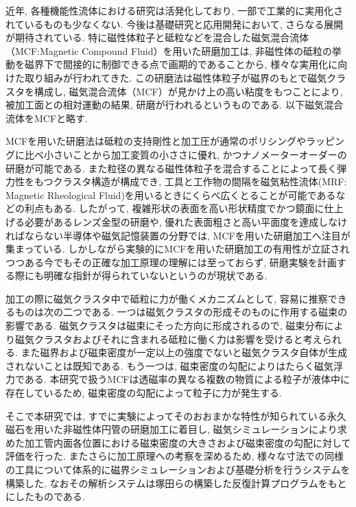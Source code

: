 \documentclass[11pt]{jarticle}
\begin{document}
近年, 各種機能性流体における研究は活発化しており, 一部で工業的に実用化されているものも少なくない\cite{磁性流体}. 今後は基礎研究と応用開発において, さらなる展開が期待されている. 特に磁性体粒子と砥粒などを混合した磁気混合流体（MCF:Magnetic Compound Fluid）を用いた研磨加工は, 非磁性体の砥粒の挙動を磁界下で間接的に制御できる点で画期的であることから, 様々な実用化に向けた取り組みが行われてきた. この研磨法は磁性体粒子が磁界のもとで磁気クラスタを構成し, 磁気混合流体（MCF）が見かけ上の高い粘度をもつことにより, 被加工面との相対運動の結果, 研磨が行われるというものである. 以下磁気混合流体をMCFと略す. \par
MCFを用いた研磨法は砥粒の支持剛性と加工圧が通常のポリシングやラッピングに比べ小さいことから加工変質の小ささに優れ\cite{精密機械加工の原理}, かつナノメーターオーダーの研磨が可能である. また粒径の異なる磁性体粒子を混合することによって長く弾力性をもつクラスタ構造が構成でき, 工具と工作物の間隔を磁気粘性流体(MRF: Magnetic Rheological Fluid)を用いるときにくらべ広くとることが可能であるなどの利点もある\cite{機能性流体}. したがって, 複雑形状の表面を高い形状精度でかつ鏡面に仕上げる必要があるレンズ金型の研磨や, 優れた表面粗さと高い平面度を達成しなければならない半導体や磁気記憶装置の分野では, MCFを用いた研磨加工へ注目が集まっている. しかしながら実験的にMCFを用いた研磨加工の有用性が立証されつつある今でもその正確な加工原理の理解には至っておらず, 研磨実験を計画する際にも明確な指針が得られていないというのが現状である. \par
加工の際に磁気クラスタ中で砥粒に力が働くメカニズムとして, 容易に推察できるものは次の二つである. 一つは磁気クラスタの形成そのものに作用する磁束の影響である. 磁気クラスタは磁束にそった方向に形成されるので, 磁束分布により磁気クラスタおよびそれに含まれる砥粒に働く力は影響を受けると考えられる. また磁界および磁束密度が一定以上の強度でないと磁気クラスタ自体が生成されないことは既知である. もう一つは, 磁束密度の勾配によりはたらく磁気浮力である. 本研究で扱うMCFは透磁率の異なる複数の物質による粒子が液体中に存在しているため, 磁束密度の勾配によって粒子に力が発生する. \par
そこで本研究では, すでに実験によってそのおおまかな特性が知られている永久磁石を用いた非磁性体円管の研磨加工\cite{西田}に着目し, 磁気シミュレーションにより求めた加工管内面各位置における磁束密度の大きさおよび磁束密度の勾配に対して評価を行った. またさらに加工原理への考察を深めるため, 様々な寸法での同様の工具について体系的に磁界シミュレーションおよび基礎分析を行うシステムを構築した. なおその解析システムは塚田らの構築した反復計算プログラム\cite{塚田}をもとにしたものである. 
\newpage
\end{document}
